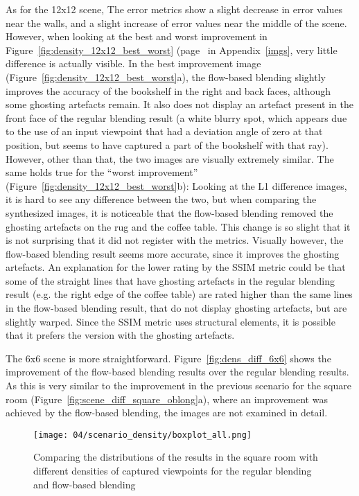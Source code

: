 As for the 12x12 scene, The error metrics show a slight decrease in error values near the walls, and a slight increase of error values near the middle of the scene. However, when looking at the best and worst improvement in Figure~\ref{fig:density_12x12_best_worst} (page~\pageref{fig:density_12x12_best_worst} in Appendix~\ref{imgs}, very little difference is actually visible. In the best improvement image (Figure~\ref{fig:density_12x12_best_worst}a), the flow-based blending slightly improves the accuracy of the bookshelf in the right and back faces, although some ghosting artefacts remain. It also does not display an artefact present in the front face of the regular blending result (a white blurry spot, which appears due to the use of an input viewpoint that had a deviation angle of zero at that position, but seems to have captured a part of the bookshelf with that ray). However, other than that, the two images are visually extremely similar. The same holds true for the ``worst improvement'' (Figure~\ref{fig:density_12x12_best_worst}b): Looking at the L1 difference images, it is hard to see any difference between the two, but when comparing the synthesized images, it is noticeable that the flow-based blending removed the ghosting artefacts on the rug and the coffee table. This change is so slight that it is not surprising that it did not register with the metrics. Visually however, the flow-based blending result seems more accurate, since it improves the ghosting artefacts. An explanation for the lower rating by the SSIM metric could be that some of the straight lines that have ghosting artefacts in the regular blending result (e.g. the right edge of the coffee table) are rated higher than the same lines in the flow-based blending result, that do not display ghosting artefacts, but are slightly warped. Since the SSIM metric uses structural elements, it is possible that it prefers the version with the ghosting artefacts.

The 6x6 scene is more straightforward. Figure~\ref{fig:dens_diff_6x6} shows the improvement of the flow-based blending results over the regular blending results. As this is very similar to the improvement in the previous scenario for the square room (Figure~\ref{fig:scene_diff_square_oblong}a), where an improvement was achieved by the flow-based blending, the images are not examined in detail.

\begin{figure}
		\centering
		\texttt{[image: 04/scenario\_density/boxplot\_all.png]}
		\caption[Comparing the distributions of all of the results with different densities]{Comparing the distributions of the results in the square room with different densities of captured viewpoints for the regular blending and flow-based blending}
		\label{fig:scenario_dens_boxplot}
\end{figure}

